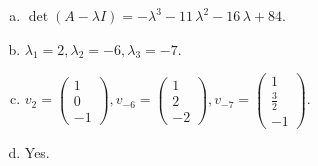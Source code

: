 \begin{questions}
\begin{solution}
\begin{enumerate}[(a)]
\item $\det(A-\lambda I)=-{\lambda}^{3} - 11 \, {\lambda}^{2} - 16 \, {\lambda} + 84$.
\item ${\lambda}_1=2, {\lambda}_2=-6, {\lambda}_3=-7$.
\item $v_{2}=\left(\begin{array}{r}
1 \\
0 \\
-1
\end{array}\right), v_{-6}=\left(\begin{array}{r}
1 \\
2 \\
-2
\end{array}\right), v_{-7}=\left(\begin{array}{r}
1 \\
\frac{3}{2} \\
-1
\end{array}\right)$.
\item Yes.
\end{enumerate}
\end{solution}

\end{questions}

\newpage


\begin{center}
\end{center}

